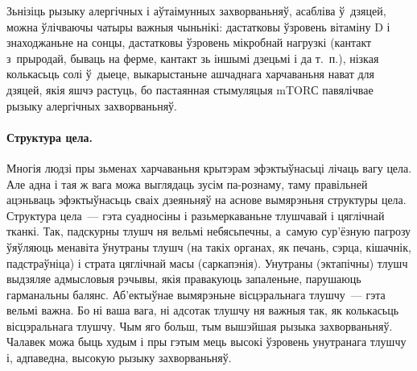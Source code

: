 Зьнізіць рызыку алергічных і аўтаімунных захворваньняў, асабліва ў~дзяцей, можна ўлічваючы чатыры важныя чыньнікі: дастатковы ўзровень вітаміну D і знаходжаньне на сонцы, дастатковы ўзровень мікробнай нагрузкі (кантакт з~прыродай, бываць на ферме, кантакт зь іншымі дзецьмі і да т.~п.), нізкая колькасьць солі ў~дыеце, выкарыстаньне ашчаднага харчаваньня нават для дзяцей, якія яшчэ растуць, бо пастаянная стымуляцыя mTORС павялічвае рызыку алергічных захворваньняў.

\paragraph{Структура цела.}
Многія людзі пры зьменах харчаваньня крытэрам эфэктыўнасьці лічаць вагу цела. Але адна і тая ж вага можа выглядаць зусім па-рознаму, таму правільней ацэньваць эфэктыўнасьць сваіх дзеяньняў на аснове вымярэньня структуры цела. Структура цела~--- гэта суадносіны і разьмеркаваньне тлушчавай і цяглічнай тканкі. Так, падскурны тлушч ня вельмі небясьпечны, а~самую сур'ёзную пагрозу ўяўляюць менавіта ўнутраны тлушч (на такіх органах, як печань, сэрца, кішачнік, падстраўніца) і страта цяглічнай масы (саркапэнія). Унутраны (эктапічны) тлушч выдзяляе адмысловыя рэчывы, якія правакуюць запаленьне, парушаюць гарманальны балянс. Аб'ектыўнае вымярэньне вісцэральнага тлушчу~--- гэта вельмі важна. Бо ні ваша вага, ні адсотак тлушчу ня важныя так, як колькасьць вісцэральнага тлушчу. Чым яго больш, тым вышэйшая рызыка захворваньняў. Чалавек можа быць худым і пры гэтым мець высокі ўзровень унутранага тлушчу і, адпаведна, высокую рызыку захворваньняў.


